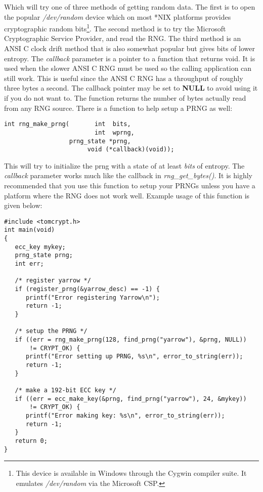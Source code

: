 \documentclass[synpaper]{book}
\begin{document}
Which will try one of three methods of getting random data.  The first is to open the popular \textit{/dev/random} device which
on most *NIX platforms provides cryptographic random bits\footnote{This device is available in Windows through the Cygwin compiler suite.  It emulates \textit{/dev/random} via the Microsoft CSP.}.
The second method is to try the Microsoft Cryptographic Service Provider, and read the RNG.  The third method is an ANSI C
clock drift method that is also somewhat popular but gives bits of lower entropy.  The \textit{callback} parameter is a pointer to a function that returns void.  It is
used when the slower ANSI C RNG must be used so the calling application can still work.  This is useful since the ANSI C RNG has a throughput of roughly three
bytes a second.  The callback pointer may be set to {\bf NULL} to avoid using it if you do not want to.  The function returns the number of bytes actually read from
any RNG source.  There is a function to help setup a PRNG as well:
\begin{verbatim}
int rng_make_prng(       int  bits,
                         int  wprng,
                  prng_state *prng,
                       void (*callback)(void));
\end{verbatim}
This will try to initialize the prng with a state of at least \textit{bits} of entropy.  The \textit{callback} parameter works much like
the callback in \textit{rng\_get\_bytes()}.  It is highly recommended that you use this function to setup your PRNGs unless you have a
platform where the RNG does not work well.  Example usage of this function is given below:

\begin{small}
\begin{verbatim}
#include <tomcrypt.h>
int main(void)
{
   ecc_key mykey;
   prng_state prng;
   int err;

   /* register yarrow */
   if (register_prng(&yarrow_desc) == -1) {
      printf("Error registering Yarrow\n");
      return -1;
   }

   /* setup the PRNG */
   if ((err = rng_make_prng(128, find_prng("yarrow"), &prng, NULL))
       != CRYPT_OK) {
      printf("Error setting up PRNG, %s\n", error_to_string(err));
      return -1;
   }

   /* make a 192-bit ECC key */
   if ((err = ecc_make_key(&prng, find_prng("yarrow"), 24, &mykey))
       != CRYPT_OK) {
      printf("Error making key: %s\n", error_to_string(err));
      return -1;
   }
   return 0;
}
\end{verbatim}
\end{small}
\end{document}
